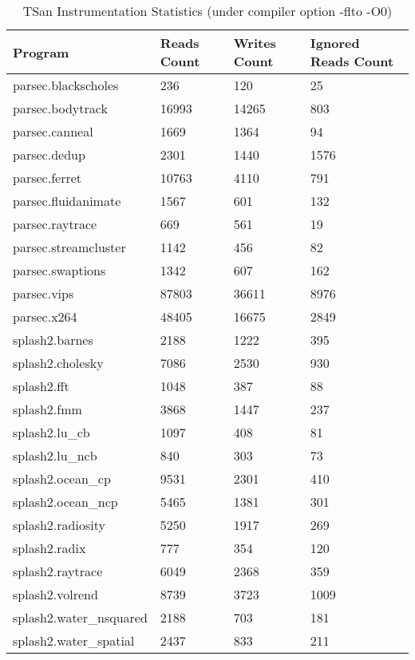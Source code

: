 \begin{table}[htbp]
\centering
\begin{tabular}{|l|l|l|l|}\hline \hline
Program  & Reads Count  & Writes Count  & Ignored Reads Count  \\ \hline \hline
parsec.blackscholes &  236 &  120 &  25 \\ \hline
parsec.bodytrack &  16993 &  14265 &  803 \\ \hline
parsec.canneal &  1669 &  1364 &  94 \\ \hline
parsec.dedup &  2301 &  1440 &  1576 \\ \hline
parsec.ferret &  10763 &  4110 &  791 \\ \hline
parsec.fluidanimate &  1567 &  601 &  132 \\ \hline
parsec.raytrace &  669 &  561 &  19 \\ \hline
parsec.streamcluster &  1142 &  456 &  82 \\ \hline
parsec.swaptions &  1342 &  607 &  162 \\ \hline
parsec.vips &  87803 &  36611 &  8976 \\ \hline
parsec.x264 &  48405 &  16675 &  2849 \\ \hline
splash2.barnes &  2188 &  1222 &  395 \\ \hline
splash2.cholesky &  7086 &  2530 &  930 \\ \hline
splash2.fft &  1048 &  387 &  88 \\ \hline
splash2.fmm &  3868 &  1447 &  237 \\ \hline
splash2.lu\_cb &  1097 &  408 &  81 \\ \hline
splash2.lu\_ncb &  840 &  303 &  73 \\ \hline
splash2.ocean\_cp &  9531 &  2301 &  410 \\ \hline
splash2.ocean\_ncp &  5465 &  1381 &  301 \\ \hline
splash2.radiosity &  5250 &  1917 &  269 \\ \hline
splash2.radix &  777 &  354 &  120 \\ \hline
splash2.raytrace &  6049 &  2368 &  359 \\ \hline
splash2.volrend &  8739 &  3723 &  1009 \\ \hline
splash2.water\_nsquared &  2188 &  703 &  181 \\ \hline
splash2.water\_spatial &  2437 &  833 &  211 \\ \hline
\end{tabular}
\caption{TSan Instrumentation Statistics (under compiler option -flto -O0)}
\end{table}




